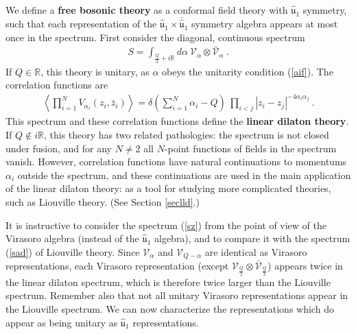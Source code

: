 \documentclass[12pt,a4paper,notitlepage]{report}
\newcommand \la {\left\langle}
\newcommand \ra {\right\rangle}
\newcommand \R {\mathbb{R}}
\numberwithin{equation}{section}
\theoremstyle{break}
\begin{document}
We define a \textbf{\boldmath free bosonic theory} as a conformal field theory with $\hat{\mathfrak{u}}_1$ symmetry, such that each representation of the $\hat{\mathfrak{u}}_1 \times \bar{\hat{\mathfrak{u}}}_1$ symmetry algebra appears at most once in the spectrum. First consider the diagonal, continuous spectrum 
\begin{align}
 \boxed{S = \int_{\frac{Q}{2}+i\R} d\alpha \ \mathcal{V}_\alpha \otimes \bar{\mathcal{V}}_\alpha}\ .
\label{sz}
\end{align}
If $Q\in \R$, this theory is unitary, as $\alpha$ obeys the unitarity condition (\ref{aif}). The correlation functions are 
\begin{align}
 \la \prod_{i=1}^N V_{\alpha_i}(z_i,\bar{z}_i)\ra = \delta\left({\textstyle \sum}_{i=1}^N\alpha_i-Q\right)\ \prod_{i<j} |z_i-z_j|^{-4\alpha_i\alpha_j} \ .
\label{dpzz}
\end{align}
This spectrum and these correlation functions define the \textbf{\boldmath linear dilaton theory}. 
If $Q\notin i\R$, this theory has two related pathologies: the spectrum is not closed under fusion, and for any $N\neq 2$ all $N$-point functions of fields in the spectrum vanish. However, correlation functions have natural continuations to momentums $\alpha_i$ outside the spectrum, and these continuations are used in the main application of the linear dilaton theory: 
as a tool for studying more complicated theories, such as Liouville theory. (See Section \ref{seclld}.) 

It is instructive to consider the spectrum (\ref{sz}) from the point of view of the Virasoro algebra (instead of the $\hat{\mathfrak{u}}_1$ algebra), and to compare it with the spectrum (\ref{sad}) of Liouville theory. Since $\mathcal{V}_\alpha$ and $\mathcal{V}_{Q-\alpha}$ are identical as Virasoro representations, each Virasoro representation (except $\mathcal{V}_{\frac{Q}{2}}\otimes \bar{\mathcal{V}}_{\frac{Q}{2}}$) appears twice in the linear dilaton spectrum, which is therefore twice larger than the Liouville spectrum. Remember also that not all unitary Virasoro representations appear in the Liouville spectrum. We can now characterize
the representations which do appear as being unitary as $\hat{\mathfrak{u}}_1$ representations.
\end{document}
